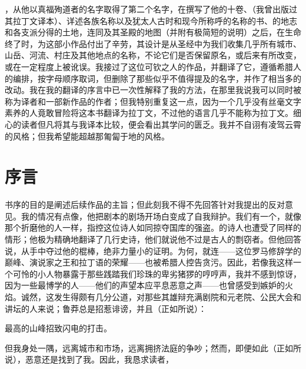 ，从他以真福殉道者的名字取得了第二个名字，在撰写了他的十卷、（我曾出版过其拉丁文译本）、详述各族名称以及犹太人古时和现今所称呼的名称的书、的地志和各支派分得的土地，连同及其圣殿的地图（并附有极简短的说明）之后，在生命终了时，为这部小作品付出了辛劳，其设计是从圣经中为我们收集几乎所有城市、山岳、河流、村庄及其他地点的名称，不论它们是否保留原名，或后来有所改变，或在一定程度上被讹误。我接过了这位可钦之人的作品，并翻译了它，遵循希腊人的编排，按字母顺序取词，但删除了那些似乎不值得提及的名字，并作了相当多的改动。我在我的翻译的序言中已一次性解释了我的方法，在那里我说我可以同时被称为译者和一部新作品的作者；但我特别重复这一点，因为一个几乎没有丝毫文字素养的人竟敢冒险将这本书翻译为拉丁文，不过他的语言几乎不能称为拉丁文。细心的读者但凡将其与我译本比较，便会看出其学问的匮乏。我并不自诩有凌驾云霄的风格；但我希望能超越那匍匐于地的风格。\par


\section{序言}

\par

书序的目的是阐述后续作品的主旨；但此刻我不得不先回答针对我提出的反对意见。我的情况有点像，他把剧本的剧场开场白变成了自我辩护。我们有一个，就像那个折磨他的人一样，指控这位诗人如同掠夺国库的强盗。的诗人也遭受了同样的情形；他极为精确地翻译了几行史诗，他们就说他不过是古人的剽窃者。但他回答说，从手中夺过他的棍棒，绝非力量小的证明。为何，就连——这位罗马修辞学的巅峰、演说家之王和拉丁语的荣耀——也被希腊人控告贪污。因此，若像我这样一个可怜的小人物暴露于那些践踏我们珍珠的卑劣猪猡的哼哼声，我并不感到惊讶，因为一些最博学的人——他们的声望本应平息恶意之声——也曾感受到嫉妒的火焰。诚然，这发生得颇有几分公道，对那些其雄辩充满剧院和元老院、公民大会和讲坛的人来说；鲁莽总是招惹诽谤，并且（正如所说）：\par

最高的山峰招致\newline{}闪电的打击。\par

但我身处一隅，远离城市和市场，远离拥挤法庭的争吵；然而，即便如此（正如所说），恶意还是找到了我。因此，我恳求读者，\par

